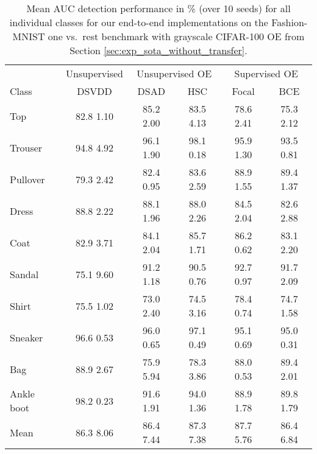 \documentclass[10pt]{article} \usepackage[accepted]{stylefiles/tmlr}
\begin{document}
\begin{table*}[th]
    \caption{Mean AUC detection performance in \% (over 10 seeds) for all individual classes for our end-to-end implementations on the Fashion-MNIST one vs.~rest benchmark with grayscale CIFAR-100 OE from Section \ref{sec:exp_sota_without_transfer}. }
    \label{tab:fmnist_one_vs_rest_wo_transfer}
    \vspace{0.5em}
    \centering\footnotesize
    
\begin{tabular}{lccccc}
\toprule
& \multicolumn{1}{c|}{Unsupervised} & \multicolumn{2}{c|}{Unsupervised OE} & \multicolumn{2}{c}{Supervised OE} \\
Class &   \multicolumn{1}{c|}{DSVDD} & DSAD & \multicolumn{1}{c|}{HSC} & Focal & \multicolumn{1}{c}{BCE} \\
\midrule
Top & \multicolumn{1}{c|}{82.8  1.10} & 85.2  2.00 & \multicolumn{1}{c|}{83.5  4.13} & 78.6  2.41 & \multicolumn{1}{c}{75.3  2.12} \\
Trouser & \multicolumn{1}{c|}{94.8  4.92} & 96.1  1.90 & \multicolumn{1}{c|}{98.1  0.18} & 95.9  1.30 & \multicolumn{1}{c}{93.5  0.81} \\
Pullover & \multicolumn{1}{c|}{79.3  2.42} & 82.4  0.95 & \multicolumn{1}{c|}{83.6  2.59} & 88.9  1.55 & \multicolumn{1}{c}{89.4  1.37} \\
Dress & \multicolumn{1}{c|}{88.8  2.22} & 88.1  1.96 & \multicolumn{1}{c|}{88.0  2.26} & 84.5  2.04 & \multicolumn{1}{c}{82.6  2.88} \\
Coat & \multicolumn{1}{c|}{82.9  3.71} & 84.1  2.04 & \multicolumn{1}{c|}{85.7  1.71} & 86.2  0.62 & \multicolumn{1}{c}{83.1  2.20} \\
Sandal & \multicolumn{1}{c|}{75.1  9.60} & 91.2  1.18 & \multicolumn{1}{c|}{90.5  0.76} & 92.7  0.97 & \multicolumn{1}{c}{91.7  2.09} \\
Shirt & \multicolumn{1}{c|}{75.5  1.02} & 73.0  2.40 & \multicolumn{1}{c|}{74.5  3.16} & 78.4  0.74 & \multicolumn{1}{c}{74.7  1.58} \\
Sneaker & \multicolumn{1}{c|}{96.6  0.53} & 96.0  0.65 & \multicolumn{1}{c|}{97.1  0.49} & 95.1  0.69 & \multicolumn{1}{c}{95.0  0.31} \\
Bag & \multicolumn{1}{c|}{88.9  2.67} & 75.9  5.94 & \multicolumn{1}{c|}{78.3  3.86} & 88.0  0.53 & \multicolumn{1}{c}{89.4  2.01} \\
Ankle boot & \multicolumn{1}{c|}{98.2  0.23} & 91.6  1.91 & \multicolumn{1}{c|}{94.0  1.36} & 88.9  1.78 & \multicolumn{1}{c}{89.8  1.79} \\
\midrule
Mean & \multicolumn{1}{c|}{86.3  8.06} & 86.4  7.44 & \multicolumn{1}{c|}{87.3  7.38} & 87.7  5.76 & \multicolumn{1}{c}{86.4  6.84} \\
\bottomrule
\end{tabular}
     \end{table*}
\end{document}
